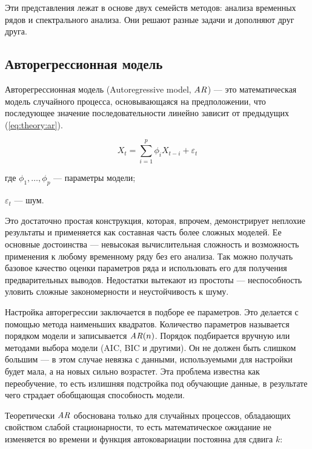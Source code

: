 Эти представления лежат в основе двух семейств методов: анализа временных рядов и спектрального анализа. Они решают разные задачи и дополняют друг друга.


\subsection{Авторегрессионная модель}

Авторегрессионная модель (Autoregressive model, $\mathit{AR}$) --- это математическая модель случайного процесса, основывающаяся на предположении, что последующее значение последовательности линейно зависит от предыдущих (\autoref{eq:theory:ar}). \cite{weber_time_series}

\begin{equation}
  \label{eq:theory:ar}
  X_t = \sum_{i=1}^p \phi_i X_{t-i} + \varepsilon_t
\end{equation}
\begin{explanation}
\item[где] $\phi_1, \dotsc, \phi_p$ --- параметры модели;
\item $\varepsilon_t$ --- шум.
\end{explanation}

Это достаточно простая конструкция, которая, впрочем, демонстрирует неплохие результаты и применяется как составная часть более сложных моделей.
Ее основные достоинства --- невысокая вычислительная сложность и возможность применения к любому временному ряду без его анализа. Так можно получать базовое качество оценки параметров ряда и использовать его для получения предварительных выводов.
Недостатки вытекают из простоты --- неспособность уловить сложные закономерности и неустойчивость к шуму.


Настройка авторегрессии заключается в подборе ее параметров. Это делается с помощью метода наименьших квадратов. Количество параметров называется порядком модели и записывается $\mathit{\mathit{AR}}(n)$. Порядок подбирается вручную или методами выбора модели (AIC, BIC и другими). Он не должен быть слишком большим --- в этом случае невязка с данными, используемыми для настройки будет мала, а на новых сильно возрастет. Эта проблема известна как переобучение, то есть излишняя подстройка под обучающие данные, в результате чего страдает обобщающая способность модели.

Теоретически $\mathit{AR}$ обоснована только для случайных процессов, обладающих свойством слабой стационарности, то есть математическое ожидание не изменяется во времени и функция автоковариации постоянна для сдвига $k$:

